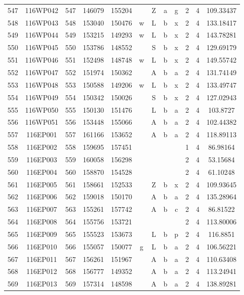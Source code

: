 \begin{tabular}{|*{12}{c|}}
547 & 116WP042 & 547 & 146079 & 155204 &  & Z & a & g & 2 & 4 & 109.33437 \\ 
548 & 116WP043 & 548 & 153040 & 150476 & w & L & b & x & 2 & 4 & 133.18417 \\ 
549 & 116WP044 & 549 & 153215 & 149293 & w & L & b & x & 2 & 4 & 143.78281 \\ 
550 & 116WP045 & 550 & 153786 & 148552 &  & S & b & x & 2 & 4 & 129.69179 \\ 
551 & 116WP046 & 551 & 152498 & 148748 & w & L & b & x & 2 & 4 & 149.55742 \\ 
552 & 116WP047 & 552 & 151974 & 150362 &  & A & b & a & 2 & 4 & 131.74149 \\ 
553 & 116WP048 & 553 & 150588 & 149206 & w & L & b & x & 2 & 4 & 133.49747 \\ 
554 & 116WP049 & 554 & 150342 & 150026 &  & S & b & x & 2 & 4 & 127.02943 \\ 
555 & 116WP050 & 555 & 150130 & 151476 &  & L & b & a & 2 & 4 & 103.8727 \\ 
556 & 116WP051 & 556 & 153448 & 155066 &  & A & b & a & 2 & 4 & 102.44382 \\ 
557 & 116EP001 & 557 & 161166 & 153652 &  & A & b & a & 2 & 4 & 118.89113 \\ 
558 & 116EP002 & 558 & 159695 & 157451 &  &  &  &  & 1 & 4 & 86.98164 \\ 
559 & 116EP003 & 559 & 160058 & 156298 &  &  &  &  & 2 & 4 & 53.15684 \\ 
560 & 116EP004 & 560 & 158870 & 154528 &  &  &  &  & 2 & 4 & 61.10248 \\ 
561 & 116EP005 & 561 & 158661 & 152533 &  & Z & b & x & 2 & 4 & 109.93645 \\ 
562 & 116EP006 & 562 & 159018 & 150170 &  & A & b & a & 2 & 4 & 135.28964 \\ 
563 & 116EP007 & 563 & 155261 & 157742 &  & A & b & c & 2 & 4 & 86.81522 \\ 
564 & 116EP008 & 564 & 155756 & 153721 &  &  &  &  & 2 & 4 & 113.80006 \\ 
565 & 116EP009 & 565 & 155523 & 153673 &  & L & b & p & 2 & 4 & 116.8851 \\ 
566 & 116EP010 & 566 & 155057 & 150077 & g & L & b & a & 2 & 4 & 106.56221 \\ 
567 & 116EP011 & 567 & 156261 & 151967 &  & A & b & a & 2 & 4 & 110.63408 \\ 
568 & 116EP012 & 568 & 156777 & 149352 &  & A & b & a & 2 & 4 & 113.24941 \\ 
569 & 116EP013 & 569 & 157314 & 148598 &  & A & b & a & 2 & 4 & 138.89281 \\ 

\end{tabular}
